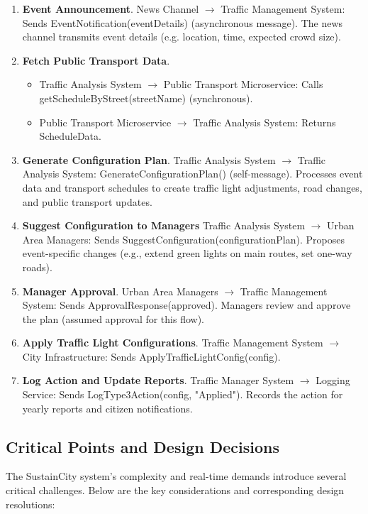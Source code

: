 \documentclass[11.5pt]{article}
\begin{document}
    \begin{enumerate}
        \item \textbf{Event Announcement}. News Channel $\rightarrow$ Traffic Management System: Sends EventNotification(eventDetails) (asynchronous message). The news channel transmits event details (e.g. location, time, expected crowd size).
        \item \textbf{Fetch Public Transport Data}. 
        \begin{itemize}
            \item Traffic Analysis System $\rightarrow$ Public Transport Microservice: Calls getScheduleByStreet(streetName) (synchronous).
            \item Public Transport Microservice $\rightarrow$ Traffic Analysis System: Returns ScheduleData.
        \end{itemize}
        \item \textbf{Generate Configuration Plan}. Traffic Analysis System $\rightarrow$ Traffic Analysis System: GenerateConfigurationPlan() (self-message). Processes event data and transport schedules to create traffic light adjustments, road changes, and public transport updates.
        \item \textbf{Suggest Configuration to Managers} Traffic Analysis System $\rightarrow$ Urban Area Managers: Sends SuggestConfiguration(configurationPlan). Proposes event-specific changes (e.g., extend green lights on main routes, set one-way roads).
        \item \textbf{Manager Approval}. Urban Area Managers $\rightarrow$ Traffic Management System: Sends ApprovalResponse(approved). Managers review and approve the plan (assumed approval for this flow).
        \item \textbf{Apply Traffic Light Configurations}. Traffic Management System $\rightarrow$ City Infrastructure: Sends ApplyTrafficLightConfig(config).
        \item \textbf{Log Action and Update Reports}. Traffic Manager System $\rightarrow$ Logging Service: Sends LogType3Action(config, "Applied"). Records the action for yearly reports and citizen notifications.
    \end{enumerate}

    \subsection{Critical Points and Design Decisions}
    
    The SustainCity system's complexity and real-time demands introduce several critical challenges. Below are the key considerations and corresponding design resolutions:
    
\end{document}

